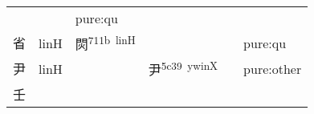 \documentclass[14pt,a4paper]{scrartcl}
\begin{document}
\begin{longtable}[c]{@{}llllll@{}}
\begin{minipage}[t]{0.14\columnwidth}
\strut\end{minipage} &
\begin{minipage}[t]{0.14\columnwidth}\raggedright\strut
\strut\end{minipage} &
\begin{minipage}[t]{0.14\columnwidth}\raggedright\strut
pure:qu
\strut\end{minipage}\tabularnewline
\begin{minipage}[t]{0.14\columnwidth}\raggedright\strut
省
\strut\end{minipage} &
\begin{minipage}[t]{0.14\columnwidth}\raggedright\strut
linH
\strut\end{minipage} &
\begin{minipage}[t]{0.14\columnwidth}\raggedright\strut
焛\textsuperscript{711b~linH}
\strut\end{minipage} &
\begin{minipage}[t]{0.14\columnwidth}\raggedright\strut
\strut\end{minipage} &
\begin{minipage}[t]{0.14\columnwidth}\raggedright\strut
\strut\end{minipage} &
\begin{minipage}[t]{0.14\columnwidth}\raggedright\strut
pure:qu
\strut\end{minipage}\tabularnewline
\begin{minipage}[t]{0.14\columnwidth}\raggedright\strut
尹
\strut\end{minipage} &
\begin{minipage}[t]{0.14\columnwidth}\raggedright\strut
linH
\strut\end{minipage} &
\begin{minipage}[t]{0.14\columnwidth}\raggedright\strut
\strut\end{minipage} &
\begin{minipage}[t]{0.14\columnwidth}\raggedright\strut
尹\textsuperscript{5c39~ywinX}
\strut\end{minipage} &
\begin{minipage}[t]{0.14\columnwidth}\raggedright\strut
\strut\end{minipage} &
\begin{minipage}[t]{0.14\columnwidth}\raggedright\strut
pure:other
\strut\end{minipage}\tabularnewline
\begin{minipage}[t]{0.14\columnwidth}\raggedright\strut
壬
\strut\end{minipage} &
\begin{minipage}[t]{0.14\columnwidth}\raggedright\strut

\end{minipage}
\end{longtable}
\end{document}

